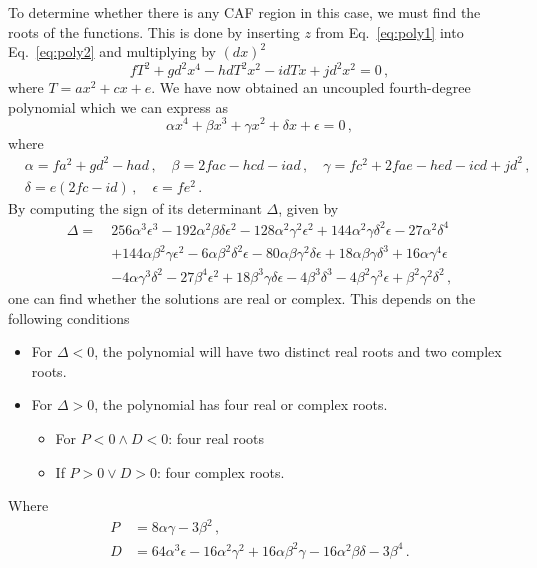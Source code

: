 To determine whether there is any CAF region in this case, we must find the roots of the functions. This is done by inserting  ${z}$ from Eq.~\eqref{eq:poly1} into Eq.~\eqref{eq:poly2} and multiplying by $(d{x})^2$
\begin{equation}
    fT^2+gd^2 {x}^4 -hdT^2 {x}^2-idT  {x} +jd^2 {x}^2=0\,,
\end{equation}
where $T=ax^2+cx+e$. We have now obtained an uncoupled fourth-degree polynomial which we can express as
\begin{equation}
    \alpha  {x}^4  + \beta {x}^3 + \gamma  {x}^2 + \delta x+ \epsilon = 0  \,,  \label{eq:poly4th}
\end{equation}
where 
\begin{align}
&\alpha=fa^2+gd^2-had\,, \quad\beta= 2fac-hcd-iad\,, \quad\gamma=fc^2+2fae-hed-icd+jd^2\,, \\&\delta=e(2fc-id)\,, \quad\epsilon=fe^2\,.
\end{align}
By computing the sign of its determinant $\Delta$, given by \cite{Gellert1977}
\begin{align}
    \Delta = \ & 256\alpha^3 \epsilon^3 - 192\alpha^2 \beta\delta\epsilon^2 - 128\alpha^2 \gamma^2 \epsilon^2 + 144\alpha^2 \gamma\delta^2 \epsilon - 27\alpha^2 \delta^4 \nonumber\\
& + 144\alpha\beta^2 \gamma\epsilon^2 - 6\alpha\beta^2 \delta^2 \epsilon - 80\alpha\beta\gamma^2 \delta\epsilon + 18\alpha\beta\gamma\delta^3 + 16\alpha\gamma^4 \epsilon \\
& - 4\alpha\gamma^3 \delta^2 - 27\beta^4 \epsilon^2 + 18\beta^3 \gamma\delta\epsilon - 4\beta^3 \delta^3 - 4\beta^2 \gamma^3 \epsilon + \beta^2 \gamma^2 \delta^2\,,\nonumber
\end{align}
one can find whether the solutions are real or complex. This depends on the following conditions \cite{Hansen:2017pwe}
\begin{itemize}
    \item For $\Delta < 0$, the polynomial will have two distinct real roots and two complex roots.
    \item For $\Delta > 0$, the polynomial has four real or complex roots.
    \begin{itemize}
        \item For $P < 0 \wedge  D < 0$: four real roots
        \item If $P > 0 \vee D > 0$: four complex roots.
    \end{itemize}
\end{itemize}
Where 
\begin{align}
    P &= 8\alpha\gamma - 3\beta^2\,,\\
    D &= 64\alpha^3 \epsilon - 16\alpha^2 \gamma^2 + 16\alpha\beta^2 \gamma - 16\alpha^2 \beta\delta - 3\beta^4\,.
\end{align}

